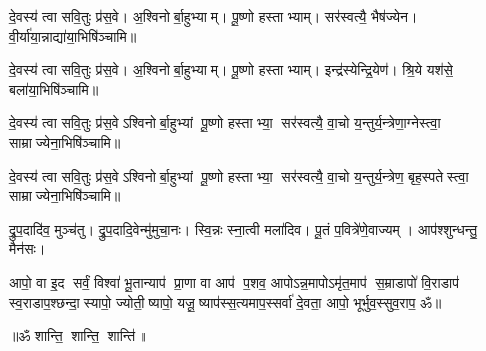 दे॒वस्य॑ त्वा सवि॒तुः प्र॑स॒वे। अ॒श्विनोर्बा॒हुभ्याम्। पू॒ष्णो हस्ताभ्याम्।
सर॑स्वत्यै॒ भैष॑ज्येन। वी॒र्या॑या॒न्नाद्या॑या॒भिषि॑ञ्चामि॥

दे॒वस्य॑ त्वा सवि॒तुः प्र॑स॒वे। अ॒श्विनोर्बा॒हुभ्याम्। पू॒ष्णो हस्ताभ्याम्।
इन्द्र॑स्येन्द्रि॒येण॑। श्रि॒ये यश॑से॒ बला॑या॒भिषि॑ञ्चामि॥

दे॒वस्य॑ त्वा सवि॒तुः प्र॑स॒वेऽश्विनोर्बा॒हुभ्यां पू॒ष्णो हस्ताभ्या॒
सर॑स्वत्यै॒ वा॒चो य॒न्तुर्य॒न्त्रेणा॒ग्नेस्त्वा॒ साम्राज्येना॒भिषि॑ञ्चामि॥

दे॒वस्य॑ त्वा सवि॒तुः प्र॑स॒वेऽश्विनोर्बा॒हुभ्यां पू॒ष्णो हस्ताभ्या॒
सर॑स्वत्यै॒ वा॒चो य॒न्तुर्य॒न्त्रेण॒ बृह॒स्पतेस्त्वा॒ साम्राज्येना॒भिषि॑ञ्चामि॥

द्रु॒प॒दादि॑व॒ मुञ्च॑तु। द्रु॒प॒दादि॒वेन्मु॑मुचा॒नः।
स्वि॒न्नः स्ना॒त्वी मला॑दिव। पू॒तं प॒वित्रे॑णे॒वाज्यम्।
आप॑श्शुन्धन्तु॒ मैन॑सः।

आपो॒ वा इ॒द सर्वं॒ विश्वा॑ भू॒तान्याप॑ प्रा॒णा वा आप॑
प॒शव॒ आपोऽन्न॒मापोऽमृ॑त॒माप॑ स॒म्राडापो॑ वि॒राडाप॑
स्व॒राडाप॒श्छन्दा॒स्यापो॒ ज्योती॒ष्यापो॒
यजू॒ष्याप॑स्स॒त्यमाप॒स्सर्वा॑ दे॒वता॒ आपो॒
भूर्भुव॒स्सुव॒राप॒ ॐ॥


\centerline{॥ॐ शान्ति॒ शान्ति॒ शान्ति॑॥}